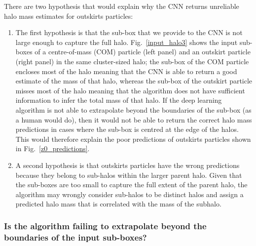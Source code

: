 \documentclass[11pt]{article}
\begin{document}
There are two hypothesis that would explain why the CNN returns unreliable halo mass estimates for outskirts particles:
\begin{enumerate}
\item The first hypothesis is that the sub-box that we provide to the CNN is not large enough to capture the full halo. Fig.~\ref{input_halo3} shows the input sub-boxes of a centre-of-mass (COM) particle (left panel) and an outskirt particle (right panel) in the same cluster-sized halo; the sub-box of the COM particle encloses most of the halo meaning that the CNN is able to return a good estimate of the mass of that halo, whereas the sub-box of the outskirt particle misses most of the halo meaning that the algorithm does not have sufficient information to infer the total mass of that halo. If the deep learning algorithm is not able to extrapolate beyond the boundaries of the sub-box (as a human would do), then it would not be able to return the correct halo mass predictions in cases where the sub-box is centred at the edge of the halos. This would therefore explain the poor predictions of outskirts particles shown in Fig.~\ref{z0_predictions}.
\item A second hypothesis is that outskirts particles have the wrong predictions because they belong to sub-halos within the larger parent halo. Given that the sub-boxes are too small to capture the full extent of the parent halo, the algorithm may wrongly consider sub-halos to be distinct halos and assign a predicted halo mass that is correlated with the mass of the subhalo. 
\end{enumerate}

\subsubsection*{Is the algorithm failing to extrapolate beyond the boundaries of the input sub-boxes?} 
\end{document}
